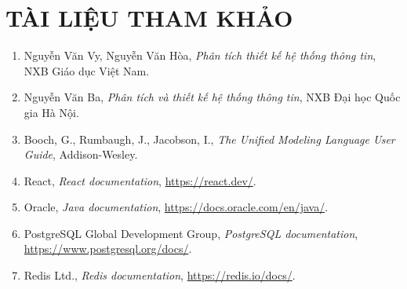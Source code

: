 \clearpage
\chapter*{TÀI LIỆU THAM KHẢO}
{}

\begingroup
\raggedright
\begin{enumerate}[leftmargin=1.8em]
\item Nguyễn Văn Vy, Nguyễn Văn Hòa, \textit{Phân tích thiết kế hệ thống thông tin}, NXB Giáo dục Việt Nam.
\item Nguyễn Văn Ba, \textit{Phân tích và thiết kế hệ thống thông tin}, NXB Đại học Quốc gia Hà Nội.
\item Booch, G., Rumbaugh, J., Jacobson, I., \textit{The Unified Modeling Language User Guide}, Addison-Wesley.
\item React, \textit{React documentation}, \url{https://react.dev/}.
\item Oracle, \textit{Java documentation}, \url{https://docs.oracle.com/en/java/}.
\item PostgreSQL Global Development Group, \textit{PostgreSQL documentation}, \url{https://www.postgresql.org/docs/}.
\item Redis Ltd., \textit{Redis documentation}, \url{https://redis.io/docs/}.
\end{enumerate}
\endgroup
